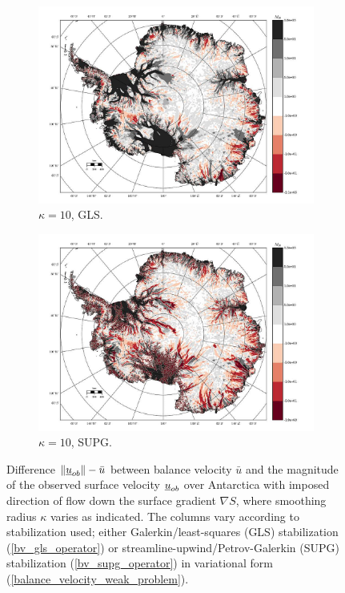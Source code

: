 \begin{figure}
  \begin{subfigure}[b]{0.45\linewidth}
    \includegraphics[width=\linewidth]{images/balance_velocity/antarctica/misfit_10H_kappa_10_GLS.jpg}
  \caption{$\kappa = 10$, GLS.}
  \label{antarctica_bv_image_kappa_5_GLS_misfit}
  \end{subfigure}
  \begin{subfigure}[b]{0.45\linewidth}
    \includegraphics[width=\linewidth]{images/balance_velocity/antarctica/misfit_10H_kappa_10_SUPG.jpg}
  \caption{$\kappa = 10$, SUPG.}
  \label{antarctica_bv_image_kappa_5_SUPG_misfit}
  \end{subfigure}
  
  \caption[Antarctica balance-velocity misfit with $\mathbf{d}^{\text{data}} = - \nabla S$.]{Difference $\Vert \underline{u}_{ob} \Vert - \bar{u}$ between balance velocity $\bar{u}$ and the magnitude of the observed surface velocity $\underline{u}_{ob}$ over Antarctica with imposed direction of flow down the surface gradient $\nabla S$, where smoothing radius $\kappa$ varies as indicated.  The columns vary according to  stabilization used; either Galerkin/least-squares (GLS) stabilization (\ref{bv_gls_operator}) or streamline-upwind/Petrov-Galerkin (SUPG) stabilization (\ref{bv_supg_operator}) in variational form (\ref{balance_velocity_weak_problem}). \newline \newline}


\end{figure}
